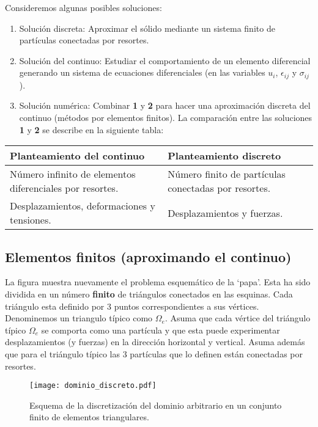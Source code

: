 Consideremos algunas posibles soluciones:
\begin{enumerate}
    \item Solución discreta: Aproximar el sólido mediante un sistema finito de 
    partículas conectadas por resortes.
    \item Solución del continuo: Estudiar el comportamiento de un elemento 
    diferencial generando un sistema de ecuaciones diferenciales (en las 
    variables $u_i$, $\epsilon_{ij}$ y $\sigma_{ij}$).
    \item Solución numérica: Combinar \textbf{1} y \textbf{2} para hacer una 
    aproximación discreta del continuo (métodos por elementos finitos). La 
    comparación entre las soluciones \textbf{1} y \textbf{2} se describe en la 
    siguiente tabla:
\end{enumerate}
%
\begin{table}[H]
\begin{tabular}{p{6cm}p{6cm}}
\hline
\textbf{Planteamiento del continuo} & 
\textbf{Planteamiento discreto}\\
\hline
Número infinito de elementos diferenciales por resortes.
& Número finito de partículas conectadas por resortes.\\
Desplazamientos, deformaciones y tensiones.
& Desplazamientos y fuerzas.\\
\hline
\end{tabular}
\end{table}


\subsection{Elementos finitos (aproximando el continuo)}
La figura muestra nuevamente el problema esquemático de la `papa'. Esta ha sido 
dividida en un número \textbf{finito} de triángulos conectados en las esquinas. 
Cada triángulo esta definido por 3 puntos correspondientes a sus vértices. 
Denominemos un triangulo típico como $\Omega_e$. Asuma que cada vértice del 
triángulo típico $\Omega_e$ se comporta como una partícula y que esta puede 
experimentar desplazamientos (y fuerzas) en la dirección horizontal y vertical. 
Asuma además que para el triángulo típico las 3 partículas que lo definen están 
conectadas por resortes.
\begin{figure}[H]
\centering
\texttt{[image: dominio\_discreto.pdf]}
\caption{Esquema de la discretización del dominio arbitrario en un conjunto 
finito de elementos triangulares.}
\label{fig:meshed}
\end{figure}

